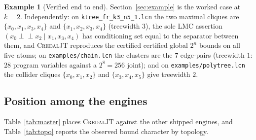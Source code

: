 \documentclass[11pt]{article}
\theoremstyle{definition}
\newtheorem{example}{Example}
\newcommand{\indep}{\perp\!\!\!\perp}
\begin{document}
\begin{example}[Verified end to end]\label{ex:d5verified}
Section~\ref{sec:example} is the worked case at $k=2$. Independently:
on \texttt{ktree\_fr\_k3\_n5\_1.lcn} the two maximal cliques are
$\{x_0,x_1,x_3,x_4\}$ and $\{x_1,x_2,x_3,x_4\}$ (treewidth $3$), the sole LMC
assertion $(x_0\indep x_2\mid x_1,x_3,x_4)$ has conditioning set equal to the
separator between them, and \textsc{CredalJT} reproduces the certified
certified global $2^n$ bounds on all five atoms; on
\texttt{examples/chain.lcn} the clusters are the $7$ edge-pairs (treewidth $1$:
$28$ program variables against a $2^8=256$ joint); and on
\texttt{examples/polytree.lcn} the collider cliques $\{x_0,x_1,x_2\}$ and
$\{x_3,x_4,x_5\}$ give treewidth $2$.
\end{example}

\subsection{Position among the engines}\label{sec:theory-position}

Table~\ref{tab:master} places \textsc{CredalJT} against the other shipped
engines, and Table~\ref{tab:topo} reports the observed bound character by
topology.
\end{document}
